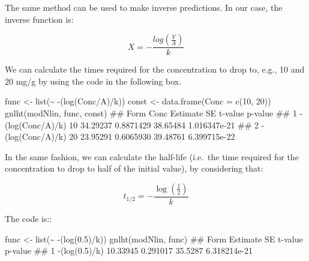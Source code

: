 \documentclass[a4paper,12pt,oneside]{book}
\newenvironment{Shaded}{\begin{snugshade}}{\end{snugshade}}
\newcommand{\DecValTok}[1]{#1}
\newcommand{\FloatTok}[1]{#1}
\newcommand{\SpecialCharTok}[1]{#1}
\newcommand{\DocumentationTok}[1]{#1}
\newcommand{\OtherTok}[1]{#1}
\newcommand{\FunctionTok}[1]{#1}
\newcommand{\AttributeTok}[1]{#1}
\newcommand{\NormalTok}[1]{#1}
\begin{document}
The same method can be used to make inverse predictions. In our case, the inverse function is:

\[X = - \frac{log \left( \frac{Y}{A} \right)}{k}\]

We can calculate the times required for the concentration to drop to, e.g., 10 and 20 mg/g by using the code in the following box.

\vspace{12pt}

\begin{Shaded}
\begin{Highlighting}[]
\NormalTok{func }\OtherTok{\textless{}{-}} \FunctionTok{list}\NormalTok{(}\SpecialCharTok{\textasciitilde{}} \SpecialCharTok{{-}}\NormalTok{(}\FunctionTok{log}\NormalTok{(Conc}\SpecialCharTok{/}\NormalTok{A)}\SpecialCharTok{/}\NormalTok{k))}
\NormalTok{const }\OtherTok{\textless{}{-}} \FunctionTok{data.frame}\NormalTok{(}\AttributeTok{Conc =} \FunctionTok{c}\NormalTok{(}\DecValTok{10}\NormalTok{, }\DecValTok{20}\NormalTok{)) }
\FunctionTok{gnlht}\NormalTok{(modNlin, func,  const)}
\DocumentationTok{\#\#               Form Conc Estimate        SE  t{-}value      p{-}value}
\DocumentationTok{\#\# 1 {-}(log(Conc/A)/k)   10 34.29237 0.8871429 38.65484 1.016347e{-}21}
\DocumentationTok{\#\# 2 {-}(log(Conc/A)/k)   20 23.95291 0.6065930 39.48761 6.399715e{-}22}
\end{Highlighting}
\end{Shaded}

In the same fashion, we can calculate the half-life (i.e.~the time required for the concentration to drop to half of the initial value), by considering that:

\[t_{1/2} = - \frac{ \log \left( {\frac{1}{2}} \right) }{k}\]

The code is::

\vspace{12pt}

\begin{Shaded}
\begin{Highlighting}[]
\NormalTok{func }\OtherTok{\textless{}{-}} \FunctionTok{list}\NormalTok{(}\SpecialCharTok{\textasciitilde{}} \SpecialCharTok{{-}}\NormalTok{(}\FunctionTok{log}\NormalTok{(}\FloatTok{0.5}\NormalTok{)}\SpecialCharTok{/}\NormalTok{k))}
\FunctionTok{gnlht}\NormalTok{(modNlin, func)}
\DocumentationTok{\#\#            Form Estimate       SE t{-}value      p{-}value}
\DocumentationTok{\#\# 1 {-}(log(0.5)/k) 10.33945 0.291017 35.5287 6.318214e{-}21}
\end{Highlighting}
\end{Shaded}
\end{document}
